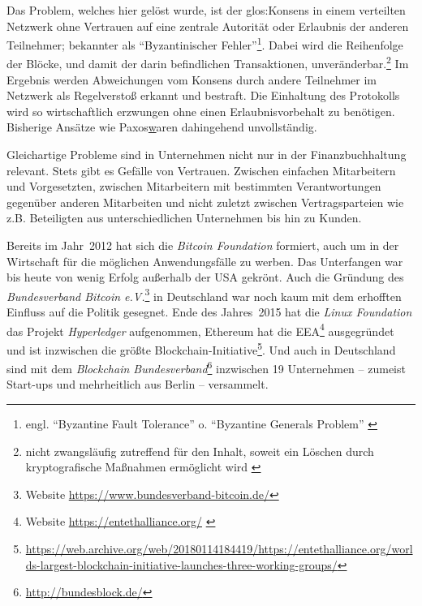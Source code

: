 Das Problem, welches hier gelöst wurde, ist der \gls{glos:Konsens} in einem verteilten Netzwerk ohne Vertrauen auf eine zentrale Autorität oder Erlaubnis der anderen Teilnehmer; bekannter als \enquote{Byzantinischer Fehler}\footnote{engl. \enquote{Byzantine Fault Tolerance} o. \enquote{Byzantine Generals Problem}  \autocite{p:byzantine-original}}.
Dabei wird die Reihenfolge der Blöcke, und damit der darin befindlichen Transaktionen, unveränderbar.\footnote{nicht zwangsläufig zutreffend für den Inhalt, soweit ein Löschen durch kryptografische Maßnahmen ermöglicht wird \autocite{w:accenture-patent}} Im Ergebnis werden Abweichungen vom Konsens durch andere Teilnehmer im Netzwerk als Regelverstoß erkannt und bestraft. Die Einhaltung des Protokolls wird so wirtschaftlich erzwungen ohne einen Erlaubnisvorbehalt zu benötigen. Bisherige Ansätze wie Paxos\href{Voraussetzung ist die Position als Legislator \autocite{p:paxos}} waren dahingehend unvollständig.


Gleichartige Probleme sind in Unternehmen nicht nur in der Finanzbuchhaltung relevant.
Stets gibt es Gefälle von Vertrauen.
Zwischen
einfachen Mitarbeitern und Vorgesetzten,
zwischen Mitarbeitern mit bestimmten Verantwortungen gegenüber anderen Mitarbeiten
und nicht zuletzt
zwischen Vertragsparteien wie z.B. Beteiligten aus unterschiedlichen Unternehmen bis hin zu Kunden.


Bereits im Jahr~2012 hat sich die \emph{Bitcoin Foundation} formiert, auch um in der Wirtschaft für die möglichen Anwendungsfälle zu werben. Das Unterfangen war bis heute von wenig Erfolg außerhalb der USA gekrönt. Auch die Gründung des \emph{Bundesverband Bitcoin e.V.}\footnote{Website \url{https://www.bundesverband-bitcoin.de/}} in Deutschland war noch kaum mit dem erhofften Einfluss auf die Politik gesegnet. Ende des Jahres~2015 hat die \emph{Linux Foundation} das Projekt \emph{Hyperledger} aufgenommen, Ethereum hat die \gls{EEA}\footnote{Website \url{https://entethalliance.org/}  \autocite{p:eea}} ausgegründet und ist inzwischen die größte Blockchain-Initiative\footnote{\url{https://web.archive.org/web/20180114184419/https://entethalliance.org/worlds-largest-blockchain-initiative-launches-three-working-groups/}}. Und auch in Deutschland sind mit dem \emph{Blockchain Bundesverband}\footnote{\url{http://bundesblock.de/}} inzwischen 19 Unternehmen -- zumeist Start-ups und mehrheitlich aus Berlin -- versammelt.

